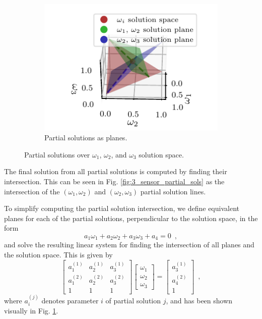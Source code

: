 \documentclass[letterpaper, 10 pt, conference]{ieeeconf}  %
\begin{document}
\begin{figure}[tb]
\begin{subfigure}[t]{0.3\textwidth}
      \begin{center}
         \includegraphics{images/partial_sol_planes.pdf}
      \end{center}
      \vspace{-10pt}
      \caption{Partial solutions as planes.}
      \label{fig:3sen_planes}
   \end{subfigure}
   \caption{Partial solutions over $\omega_1$, $\omega_2$, and $\omega_3$ solution space.}
   \vspace{-\baselineskip}
   \label{fig:partial_sols_and_planes}
\end{figure}
The final solution from all partial solutions is computed by finding their intersection. This can be seen in Fig. \ref{fig:3_sensor_partial_sols} as the intersection of the $(\omega_1,\omega_2)$ and $(\omega_2,\omega_3)$ partial solution lines.

To simplify computing the partial solution intersection, we define equivalent planes for each of the partial solutions, perpendicular to the solution space, in the form
\begin{equation}
   a_1\omega_1 + a_2\omega_2 +a_3\omega_3 + a_4 = 0\enspace, \label{eqn:3sen_plane_eq}
\end{equation}
and solve the resulting linear system for finding the intersection of all planes and the solution space. This is given by
\begin{equation}
   \begin{bmatrix}
      a_1^{(1)} & a_2^{(1)} & a_3^{(1)} \\
      a_1^{(2)} & a_2^{(2)} & a_3^{(2)} \\
      1 & 1 & 1
   \end{bmatrix}
   \begin{bmatrix}
      \omega_1 \\
      \omega_2 \\
      \omega_3
   \end{bmatrix}
   =
   \begin{bmatrix}
      a_3^{(1)} \\
      a_4^{(2)} \\
      1
   \end{bmatrix}\enspace, \label{eqn:3sen_plane_sol_eq}
\end{equation}
where $a_i^{(j)}$ denotes parameter $i$ of partial solution $j$, and has been shown visually in Fig. \ref{fig:3sen_planes}.
\end{document}
